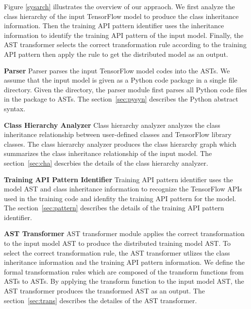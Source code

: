 Figure \ref{sysarch} illustrates the overview of our appraoch.
We first analyze the class hierarchy of the input TensorFlow model
to produce the class inheritance information.
Then the training API pattern identifier uses the inheritance information to
identify the training API pattern of the input model.
Finally, the AST transformer selects the correct transformation rule
according to the training API pattern then apply the rule to get the 
distributed model as an output.

\textbf{Parser}
Parser parses the input TensorFlow model codes into the ASTs.
We assume that the input model is given as a Python code
package in a single file directory.
Given the directory, the parser module first parses all Python code files
in the package to ASTs.
The section~\ref{sec:pysyn} describes the Python abstract syntax.

\textbf{Class Hierarchy Analyzer}
Class hierarchy analyzer analyzes the class inheritance relationship
between user-defined classes and TensorFlow library classes.
The class hierarchy analyzer produces the class hierarchy graph
which summarizes the class inheritance relationship of the input model.
The section~\ref{sec:cha} descrbies the details of the class hierarchy analyzer.

\textbf{Training API Pattern Identifier}
Training API pattern identifier uses the model AST and class inheritance 
information to recognize the TensorFlow APIs used in the training code and 
idenfity the training API pattern for the model.
The section~\ref{sec:pattern} describes the details of the training API pattern
identifier.

\textbf{AST Transformer}
AST transformer module applies the correct transformation to the
input model AST to produce the distributed training model AST.
To select the correct transformation rule,
the AST transformer utlizes the class inheritance information and
the training API pattern information.
We define the formal transformation rules which are composed of
the transform functions from ASTs to ASTs.
By applying the transform function to the input model AST,
the AST transformer produces the transformed AST as an output.
The section~\ref{sec:trans} describes the detailes of the AST transformer.
